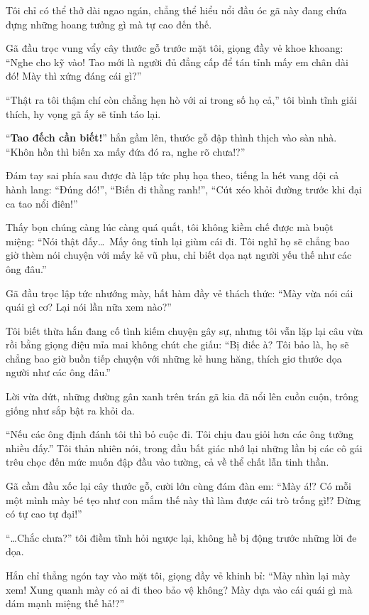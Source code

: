 \documentclass[../main.tex]{subfiles}
\begin{document}
Tôi chỉ có thể thở dài ngao ngán, chẳng thể hiểu nổi đầu óc gã này đang chứa đựng những hoang tưởng gì mà tự cao đến thế.

Gã đầu trọc vung vẩy cây thước gỗ trước mặt tôi, giọng đầy vẻ khoe khoang: ``Nghe cho kỹ vào! Tao mới là người đủ đẳng cấp để tán tỉnh mấy em chân dài đó! Mày thì xứng đáng cái gì?''

``Thật ra tôi thậm chí còn chẳng hẹn hò với ai trong số họ cả,'' tôi bình tĩnh giải thích, hy vọng gã ấy sẽ tỉnh táo lại.

``\textbf{Tao đếch cần biết!}'' hắn gầm lên, thước gỗ đập thình thịch vào sàn nhà. ``Khôn hồn thì biến xa mấy đứa đó ra, nghe rõ chưa!?''

Đám tay sai phía sau được đà lập tức phụ họa theo, tiếng la hét vang dội cả hành lang: ``Đúng đó!'', ``Biến đi thằng ranh!'', ``Cút xéo khỏi đường trước khi đại ca tao nổi điên!''

Thấy bọn chúng càng lúc càng quá quắt, tôi không kiềm chế được mà buột miệng: ``Nói thật đấy\dots\ Mấy ông tỉnh lại giùm cái đi. Tôi nghĩ họ sẽ chẳng bao giờ thèm nói chuyện với mấy kẻ vũ phu, chỉ biết dọa nạt người yếu thế như các ông đâu.''

Gã đầu trọc lập tức nhướng mày, hất hàm đầy vẻ thách thức: ``Mày vừa nói cái quái gì cơ? Lại nói lần nữa xem nào?''

Tôi biết thừa hắn đang cố tình kiếm chuyện gây sự, nhưng tôi vẫn lặp lại câu vừa rồi bằng giọng điệu mỉa mai không chút che giấu: ``Bị điếc à? Tôi bảo là, họ sẽ chẳng bao giờ buồn tiếp chuyện với những kẻ hung hăng, thích giơ thước dọa người như các ông đâu.''

Lời vừa dứt, những đường gân xanh trên trán gã kia đã nổi lên cuồn cuộn, trông giống như sắp bật ra khỏi da.

``Nếu các ông định đánh tôi thì bỏ cuộc đi. Tôi chịu đau giỏi hơn các ông tưởng nhiều đấy.'' Tôi thản nhiên nói, trong đầu bất giác nhớ lại những lần bị các cô gái trêu chọc đến mức muốn đập đầu vào tường, cả về thể chất lẫn tinh thần.

Gã cầm đầu xốc lại cây thước gỗ, cười lớn cùng đám đàn em: ``Mày á!? Có mỗi một mình mày bé tẹo như con mắm thế này thì làm được cái trò trống gì!? Đừng có tự cao tự đại!''

``\dots Chắc chưa?'' tôi điềm tĩnh hỏi ngược lại, không hề bị động trước những lời đe dọa.

Hắn chỉ thẳng ngón tay vào mặt tôi, giọng đầy vẻ khinh bỉ: ``Mày nhìn lại mày xem! Xung quanh mày có ai đi theo bảo vệ không? Mày dựa vào cái quái gì mà dám mạnh miệng thế hả!?''
\end{document}
